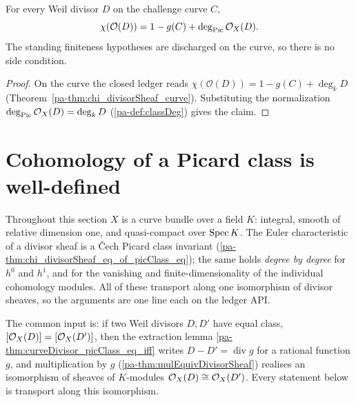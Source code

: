 \begin{theorem}
  \label{pa-thm:chi_divisorSheaf_classDeg_curve}
  \leanok

  For every Weil divisor \(D\) on the challenge curve \(C\),
  \[
    \chi(\mathcal O(D)) = 1 - g(C) + \deg_{\operatorname{Pic}}\mathcal{O}_{X}(D) .
  \]
  The standing finiteness hypotheses are discharged on the curve, so there is no side condition.
\end{theorem}
\begin{proof}
  \leanok
  On the curve the closed ledger reads \(\chi(\mathcal O(D)) = 1 - g(C) + \deg_k D\)
  (Theorem~\ref{pa-thm:chi_divisorSheaf_curve}). Substituting the normalization \(\deg_{\operatorname{Pic}}\mathcal{O}_{X}(D) = \deg_k D\) (\ref{pa-def:classDeg}) gives the claim.
\end{proof}

\section{Cohomology of a Picard class is well-defined}
\label{pa-sec:classCohomology}

Throughout this section \(X\) is a curve bundle over a field \(K\): integral, smooth of relative
dimension one, and quasi-compact over \(\operatorname{Spec} K\). The Euler characteristic of a divisor sheaf
is a \v Cech Picard class invariant (\ref{pa-thm:chi_divisorSheaf_eq_of_picClass_eq}); the same
holds \emph{degree by degree} for \(h^0\) and \(h^1\), and for the vanishing and
finite-dimensionality of the individual cohomology modules. All of these transport along one
isomorphism of divisor sheaves, so the arguments are one line each on the ledger API.

The common input is: if two Weil divisors \(D, D'\) have equal class, \([\mathcal{O}_{X}(D)] =
[\mathcal{O}_{X}(D')]\), then the extraction lemma \ref{pa-thm:curveDivisor_picClass_eq_iff} writes \(D -
D' = \operatorname{div} g\) for a rational function \(g\), and multiplication by \(g\)
(\ref{pa-thm:mulEquivDivisorSheaf}) realises an isomorphism of sheaves of \(K\)-modules \(\mathcal{O}_{X}(D) \cong \mathcal{O}_{X}(D')\). Every statement below is transport along this isomorphism.

